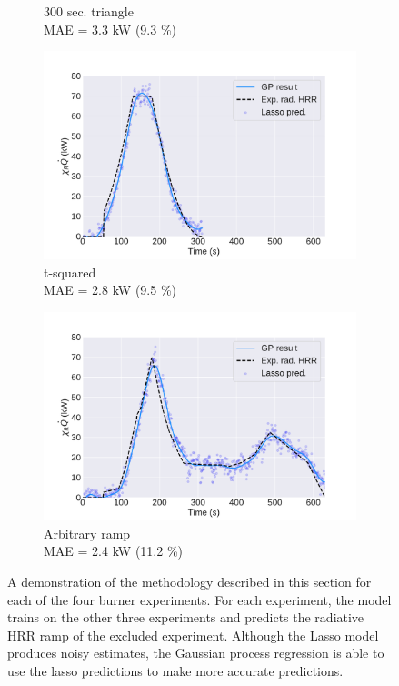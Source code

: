 \documentclass{article}
\begin{document}
\begin{figure}[htbp]
\begin{subfigure}[t]{.45\textwidth}
      \caption{300 sec. triangle \\ MAE = 3.3 kW (9.3 \%)}
      \label{fig:dft_result_300s_triangle}
  \end{subfigure}
   \begin{subfigure}[t]{.45\textwidth}
      \centering
      \includegraphics[width=\textwidth ,keepaspectratio]{figures/dft_result_t_squared.pdf}
      \caption{t-squared \\ MAE = 2.8 kW (9.5 \%)}
      \label{fig:dft_result_t_squared}
  \end{subfigure}
    \begin{subfigure}[t]{.45\textwidth}
      \centering
      \includegraphics[width=\textwidth ,keepaspectratio]{figures/dft_result_weird_curve.pdf}
      \caption{Arbitrary ramp \\ MAE = 2.4 kW (11.2 \%)}
      \label{fig:dft_result_weird_curve}
  \end{subfigure}
  \caption{A demonstration of the methodology described in this section for each of the four burner experiments. For each experiment, the model trains on the other three experiments and predicts the radiative HRR ramp of the excluded experiment. Although the Lasso model produces noisy estimates, the Gaussian process regression is able to use the lasso predictions to make more accurate predictions.} 
  \label{fig:dft_gp_results}
\end{figure}
\end{document}
